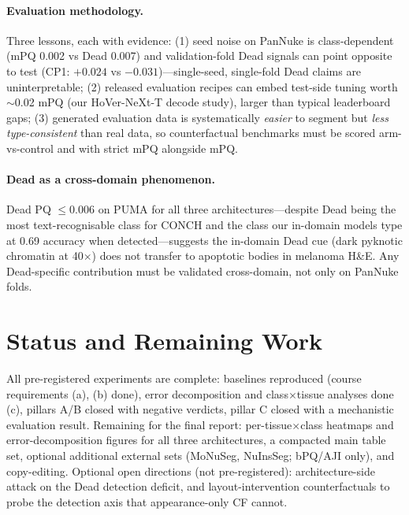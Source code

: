 \documentclass[11pt]{article}
\begin{document}
\paragraph{Evaluation methodology.} Three lessons, each with evidence: (1) seed noise on PanNuke is
class-dependent (mPQ 0.002 vs Dead 0.007) and validation-fold Dead signals can point opposite
to test (CP1: $+0.024$ vs $-0.031$)---single-seed, single-fold Dead claims are uninterpretable;
(2) released evaluation recipes can embed test-side tuning worth $\sim$0.02 mPQ (our
HoVer-NeXt-T decode study), larger than typical leaderboard gaps; (3) generated evaluation data
is systematically \emph{easier} to segment but \emph{less type-consistent} than real data, so
counterfactual benchmarks must be scored arm-vs-control and with strict mPQ alongside mPQ.

\paragraph{Dead as a cross-domain phenomenon.} Dead PQ $\le$0.006 on PUMA for all three
architectures---despite Dead being the most text-recognisable class for CONCH and the class our
in-domain models type at 0.69 accuracy when detected---suggests the in-domain Dead cue (dark
pyknotic chromatin at 40$\times$) does not transfer to apoptotic bodies in melanoma H\&E.
Any Dead-specific contribution must be validated cross-domain, not only on PanNuke folds.

\section{Status and Remaining Work}
\label{sec:status}

All pre-registered experiments are complete: baselines reproduced (course requirements (a),
(b) done), error decomposition and class$\times$tissue analyses done (c), pillars A/B closed
with negative verdicts, pillar C closed with a mechanistic evaluation result. Remaining for the
final report: per-tissue$\times$class heatmaps and error-decomposition figures for all three
architectures, a compacted main table set, optional additional external sets (MoNuSeg,
NuInsSeg; bPQ/AJI only), and copy-editing. Optional open directions (not pre-registered):
architecture-side attack on the Dead detection deficit, and layout-intervention counterfactuals
to probe the detection axis that appearance-only CF cannot.
\end{document}
